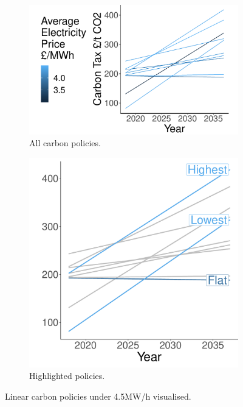 \begin{figure}
	\begin{subfigure}[h]{0.6\linewidth}
		\includegraphics[width=\linewidth]{Chapter6/figures/results/linear_actual_lines}
		\caption{All carbon policies.}
		\label{fig:linear_actual_pdcs}
	\end{subfigure}
	\hfill
	\begin{subfigure}[h]{0.39\linewidth}
		\includegraphics[width=\linewidth]{Chapter6/figures/results/highlighted_linear_actual_lines}
		\caption{Highlighted policies.}
		\label{fig:highlighted_linear_actual_strategies}
	\end{subfigure}%
	\caption{Linear carbon policies under \textsterling4.5MW/h visualised.}
\end{figure}



